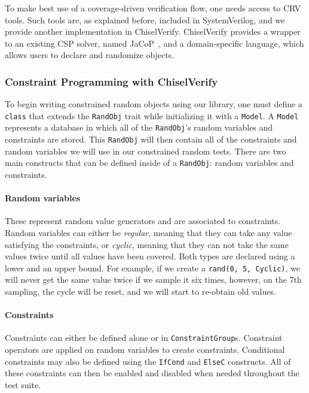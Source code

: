 \documentclass[conference]{IEEEtran}
\begin{document}
To make best use of a coverage-driven verification flow, one needs access to CRV tools. 
Such tools are, as explained before, included in SystemVerilog, and we provide another implementation in ChiselVerify. 
ChiselVerify provides a wrapper to an existing CSP solver, named JaCoP~\cite{jacop2013}, and a domain-specific language, which allows users to declare and randomize objects.

\subsubsection{Constraint Programming with ChiselVerify}
To begin writing constrained random objects using our library, one must define a \texttt{class} that extends the \texttt{RandObj} trait while initializing it with a \texttt{Model}. 
A \texttt{Model} represents a database in which all of the \texttt{RandObj}'s random variables and constraints are stored. 
This \texttt{RandObj} will then contain all of the constraints and random variables we will use in our constrained random tests. 
There are two main constructs that can be defined inside of a \texttt{RandObj}: random variables and constraints.

\paragraph{Random variables} These represent random value generators and are associated to constraints. 
Random variables can either be \textit{regular}, meaning that they can take any value satisfying the constraints, or \textit{cyclic}, meaning that they can not take the same values twice until all values have been covered.
Both types are declared using a lower and an upper bound. 
For example, if we create a \texttt{rand(0, 5, Cyclic)}, we will never get the same value twice if we sample it six times, however, on the 7th sampling, the cycle will be reset, and we will start to re-obtain old values.

\paragraph{Constraints} Constraints can either be defined alone or in \texttt{ConstraintGroup}s. 
Constraint operators are applied on random variables to create constraints.
Conditional constraints may also be defined using the \texttt{IfCond} and \texttt{ElseC} constructs. 
All of these constraints can then be enabled and disabled when needed throughout the test suite.
\end{document}

